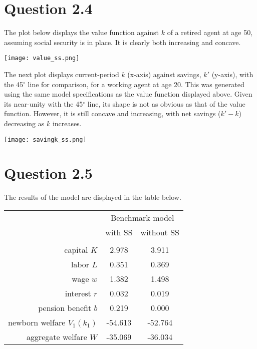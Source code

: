 \documentclass{article}
\begin{document}

\section*{Question 2.4}
The plot below displays the value function against $k$ of a retired agent at age 50, assuming social security is in place. It is clearly both increasing and concave.
\begin{center}
	\texttt{[image: value\_ss.png]}
\end{center}
The next plot displays current-period $k$ (x-axis) against savings, $k'$ (y-axis), with the 45$^{\circ}$ line for comparison, for a working agent at age 20. This was generated using the same model specifications as the value function displayed above. Given its near-unity with the 45$^{\circ}$ line, its shape is not as obvious as that of the value function. However, it is still concave and increasing, with net savings ($k'-k$) decreasing as $k$ increases.
\begin{center}
	\texttt{[image: savingk\_ss.png]}
\end{center}


\section*{Question 2.5}

The results of the model are displayed in the table below.
\begin{center}
	\begin{tabular}{r|c c}
									&	\multicolumn{2}{c}{Benchmark model}	 				\\
									& with SS 		& without SS			 				\\
		\hline\hline				&				&										\\
		capital $K$					& 2.978			& 3.911									\\
		labor $L$					& 0.351			& 0.369									\\
		wage $w$					& 1.382			& 1.498									\\
		interest $r$				& 0.032			& 0.019									\\
		pension benefit $b$			& 0.219			& 0.000									\\
		newborn welfare $V_1(k_1)$	& -54.613		& -52.764								\\
		aggregate welfare $W$		& -35.069		& -36.034
	\end{tabular}
\end{center}
\end{document}
